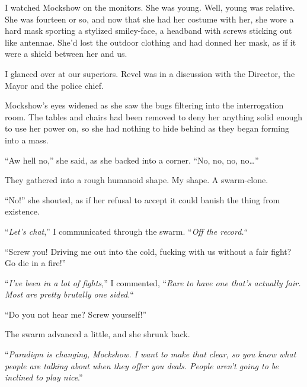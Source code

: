 \sectionbreak



I watched Mockshow on the monitors.  She was young.  Well, young was relative.  She was fourteen or so, and now that she had her costume with her, she wore a hard mask sporting a stylized smiley-face, a headband with screws sticking out like antennae.  She'd lost the outdoor clothing and had donned her mask, as if it were a shield between her and us.



I glanced over at our superiors.  Revel was in a discussion with the Director, the Mayor and the police chief.



Mockshow's eyes widened as she saw the bugs filtering into the interrogation room.  The tables and chairs had been removed to deny her anything solid enough to use her power on, so she had nothing to hide behind as they began forming into a mass.



``Aw hell no,'' she said, as she backed into a corner.  ``No, no, no, no\ldots''



They gathered into a rough humanoid shape.  My shape.  A swarm-clone.



``No!'' she shouted, as if her refusal to accept it could banish the thing from existence.



``\emph{Let's chat},'' I communicated through the swarm.  ``\emph{Off the record.}\emph{``}



``Screw you!  Driving me out into the cold, fucking with us without a fair fight?  Go die in a fire!''



``\emph{I've been in a lot of fights,}'' I commented, ``\emph{Rare to have one that's actually fair.  Most are pretty brutally one sided.}``



``Do you not hear me?  Screw yourself!''



The swarm advanced a little, and she shrunk back.



``\emph{Paradigm is changing, Mockshow.  I want to make that clear, so you know what people are talking about when they offer you deals.  People aren't going to be inclined to play nice}.''



